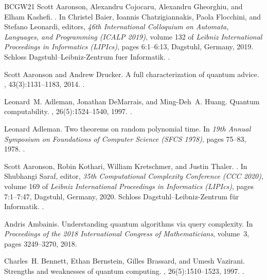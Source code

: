 \documentclass[10pt,a4paper]{article}
\begin{document}
\begin{thebibliography}{BCGW21}
Scott Aaronson, Alexandru Cojocaru, Alexandru Gheorghiu, and Elham Kashefi.
.
\newblock In Christel Baier, Ioannis Chatzigiannakis, Paola Flocchini, and
  Stefano Leonardi, editors, {\em 46th International Colloquium on Automata,
  Languages, and Programming (ICALP 2019)}, volume 132 of {\em Leibniz
  International Proceedings in Informatics (LIPIcs)}, pages 6:1--6:13,
  Dagstuhl, Germany, 2019. Schloss Dagstuhl--Leibniz-Zentrum fuer Informatik.
\newblock \href {https://doi.org/10.4230/LIPIcs.ICALP.2019.6}
  {}.

Scott Aaronson and Andrew Drucker.
\newblock A full characterization of quantum advice.
, 43(3):1131--1183, 2014.
\newblock \href {https://doi.org/10.1137/110856939}
  {}.

Leonard~M. Adleman, Jonathan DeMarrais, and Ming-Deh~A. Huang.
\newblock Quantum computability.
, 26(5):1524--1540, 1997.
\newblock \href {https://doi.org/10.1137/S0097539795293639}
  {}.

Leonard Adleman.
\newblock Two theorems on random polynomial time.
\newblock In {\em 19th Annual Symposium on Foundations of Computer Science
  (SFCS 1978)}, pages 75--83, 1978.
\newblock \href {https://doi.org/10.1109/SFCS.1978.37}
  {}.

Scott Aaronson, Robin Kothari, William Kretschmer, and Justin Thaler.
.
\newblock In Shubhangi Saraf, editor, {\em 35th Computational Complexity
  Conference (CCC 2020)}, volume 169 of {\em Leibniz International Proceedings
  in Informatics (LIPIcs)}, pages 7:1--7:47, Dagstuhl, Germany, 2020. Schloss
  Dagstuhl--Leibniz-Zentrum f{\"u}r Informatik.
\newblock \href {https://doi.org/10.4230/LIPIcs.CCC.2020.7}
  {}.

Andris Ambainis.
\newblock Understanding quantum algorithms via query complexity.
\newblock In {\em Proceedings of the 2018 International Congress of
  Mathematicians}, volume~3, pages 3249--3270, 2018.

Charles~H. Bennett, Ethan Bernstein, Gilles Brassard, and Umesh Vazirani.
\newblock Strengths and weaknesses of quantum computing.
, 26(5):1510--1523, 1997.
\newblock \href {https://doi.org/10.1137/S0097539796300933}
  {}.


\end{thebibliography}
\end{document}
